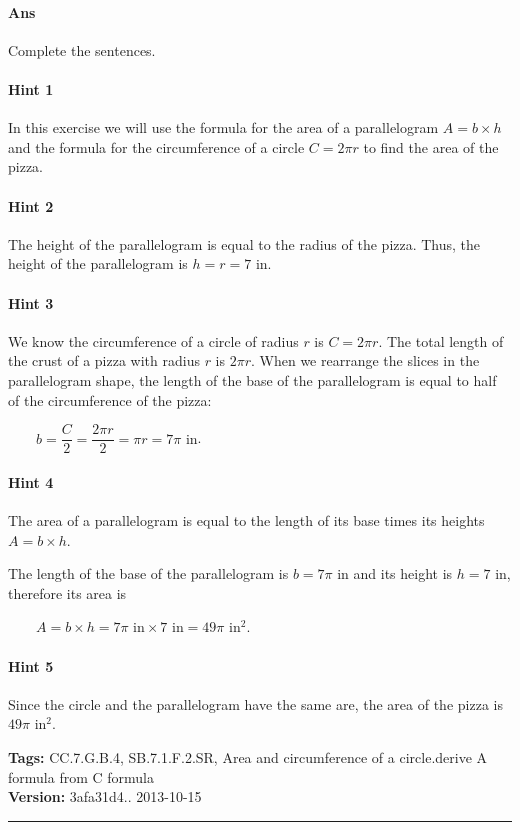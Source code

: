 \documentclass[twocolumn,10pt]{article}
\begin{document}
\paragraph{Ans} Complete the sentences. 

\paragraph{Hint 1}In this exercise we will use the formula for the area of a parallelogram $A=b\times h$ and the formula for the circumference of a circle $C=2\pi r$ to find the area of the pizza.

\paragraph{Hint 2}The height of the parallelogram is equal to the radius  of the pizza. Thus, the height of the parallelogram is $h=r=7\text{ in}$.

\paragraph{Hint 3}We know the circumference of a circle of radius $r$ is $C=2\pi r$. The total length of the crust of a pizza with radius $r$ is $2\pi r$. When we rearrange the slices in the parallelogram shape, the length of the base of the parallelogram is equal to half of the circumference of the pizza:

$\qquad b = \dfrac{C}{2} = \dfrac{ 2 \pi r }{2}= \pi r=7\pi\text{ in}$.


\paragraph{Hint 4}The area of a parallelogram is equal to the length of its base times its heights $A=b\times h$.

The length of the base of the parallelogram is $b=7\pi\text{ in}$ and its height is $h=7\text{ in}$, therefore its area is 

$\qquad A= b \times h = 7\pi\text{ in}\times 7\text{ in} = 49\pi\text{ in}^2$.


\paragraph{Hint 5}Since the circle and the parallelogram have the same are, the area of the pizza is $49\pi\text{ in}^2$.




\medskip
\noindent
\textbf{Tags:} {\footnotesize CC.7.G.B.4, SB.7.1.F.2.SR, Area and circumference of a circle.derive A formula from C formula}\\
\textbf{Version:} 3afa31d4.. 2013-10-15
\smallskip\hrule
\end{document}
